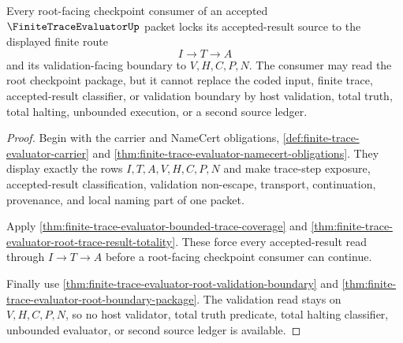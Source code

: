 \begin{theorem}
\label{thm:finite-trace-evaluator-checkpoint-source-lock}
Every root-facing checkpoint consumer of an accepted $\FiniteTraceEvaluatorUp$
packet locks its accepted-result source to the displayed finite route
$$
I \to T \to A
$$
and its validation-facing boundary to $V,H,C,P,N$. The consumer may read the
root checkpoint package, but it cannot replace the coded input, finite trace,
accepted-result classifier, or validation boundary by host validation, total
truth, total halting, unbounded execution, or a second source ledger.
\end{theorem}
\begin{proof}
Begin with the carrier and NameCert obligations,
\autoref{def:finite-trace-evaluator-carrier} and
\autoref{thm:finite-trace-evaluator-namecert-obligations}. They display exactly
the rows $I,T,A,V,H,C,P,N$ and make trace-step exposure, accepted-result
classification, validation non-escape, transport, continuation, provenance, and
local naming part of one packet.

Apply \autoref{thm:finite-trace-evaluator-bounded-trace-coverage} and
\autoref{thm:finite-trace-evaluator-root-trace-result-totality}. These force
every accepted-result read through $I \to T \to A$ before a root-facing
checkpoint consumer can continue.

Finally use \autoref{thm:finite-trace-evaluator-root-validation-boundary} and
\autoref{thm:finite-trace-evaluator-root-boundary-package}. The validation read
stays on $V,H,C,P,N$, so no host validator, total truth predicate, total
halting classifier, unbounded evaluator, or second source ledger is available.
\end{proof}

